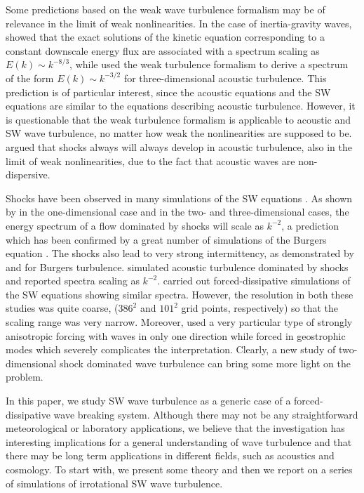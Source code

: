 Some predictions  based on the weak wave turbulence formalism
\citep[]{ZakharovLvovFalkovich1992, Nazarenko2011} may be of relevance in the limit of weak nonlinearities. In the case of
inertia-gravity waves, \cite{FalkovichMedvedev1992} showed that the exact
solutions of the kinetic equation corresponding to a constant downscale energy
flux are associated with a spectrum scaling as $E(k) \sim k^{-8/3}$, while
\cite{ZakharovSagdeev1970} used the weak turbulence formalism to derive a spectrum
of the form $ E(k) \sim k^{-3/2} $ for three-dimensional acoustic turbulence. This prediction is
of particular interest, since the acoustic equations and the SW equations are similar
to the equations describing acoustic turbulence. However, it is questionable that
the weak turbulence formalism is
applicable to acoustic and SW wave turbulence, no matter how weak the
nonlinearities are supposed to be.  \cite{KadomtsevPet1973} argued that shocks always will always develop in acoustic turbulence, also in the limit of weak nonlinearities, due to the fact that acoustic waves are non-dispersive.

Shocks have been observed in many simulations of the SW equations \citep[]{FargeSadourny1989,
PolvaniMcWilliamsSpallFord1994, LahayeZeitlin2012}. As shown by \cite{Burgers1948} in the one-dimensional case and \cite{Kuznetsov2004} in the two- and three-dimensional cases, the energy spectrum of a flow dominated by
shocks will scale as $ k^{-2} $, a prediction which has been confirmed by a
great number of simulations of the Burgers equation \citep[for a review, see ]
[]{Frisch2001}. The shocks also lead to very strong intermittency, as
demonstrated by \cite{BouchaudMezardParisi1995} and
\cite{WeinanKhaninMazelSinai1997} for Burgers turbulence.
%
\cite{FalkovichMeyer1996} simulated acoustic turbulence dominated by shocks
and reported spectra scaling as $ k^{-2} $.
\cite{YuanHamilton1994} carried out
forced-dissipative simulations of the SW equations showing similar spectra.
However, the resolution in both these studies was quite coarse, ($386^2$
and $101^2$ grid points, respectively) so that the scaling range was very
narrow.  Moreover, \cite{FalkovichMeyer1996} used a very particular
type of strongly anisotropic forcing with waves in only one
direction while \cite{YuanHamilton1994} forced in geostrophic modes
which severely complicates the interpretation. Clearly, a new study of two-dimensional shock dominated wave turbulence can bring some more light on the problem.

In this paper, we study SW wave turbulence as a generic case of a forced-dissipative wave breaking system. Although there may not be any straightforward meteorological or laboratory applications,  we believe that the investigation has interesting implications for a general understanding of wave turbulence and that there may be long term applications in different fields, such as acoustics and cosmology.  To start with, we present some theory and then we report on a series of simulations of irrotational SW wave turbulence.


